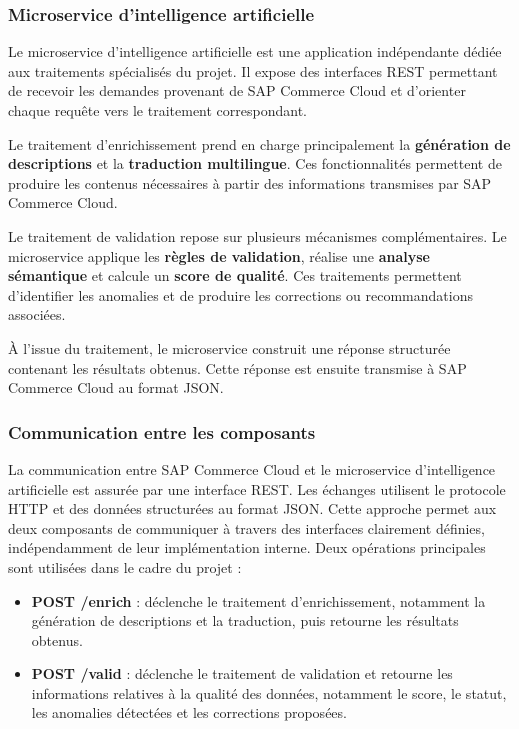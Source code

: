 \subsubsection{Microservice d'intelligence artificielle}

Le microservice d'intelligence artificielle est une application indépendante dédiée aux traitements spécialisés du projet. Il expose des interfaces REST permettant de recevoir les demandes provenant de SAP Commerce Cloud et d'orienter chaque requête vers le traitement correspondant.

Le traitement d'enrichissement prend en charge principalement la \textbf{génération de descriptions} et la \textbf{traduction multilingue}. Ces fonctionnalités permettent de produire les contenus nécessaires à partir des informations transmises par SAP Commerce Cloud.

Le traitement de validation repose sur plusieurs mécanismes complémentaires. Le microservice applique les \textbf{règles de validation}, réalise une \textbf{analyse sémantique} et calcule un \textbf{score de qualité}. Ces traitements permettent d'identifier les anomalies et de produire les corrections ou recommandations associées.

À l'issue du traitement, le microservice construit une réponse structurée contenant les résultats obtenus. Cette réponse est ensuite transmise à SAP Commerce Cloud au format JSON.

\subsubsection{Communication entre les composants}

La communication entre SAP Commerce Cloud et le microservice d'intelligence artificielle est assurée par une interface REST. Les échanges utilisent le protocole HTTP et des données structurées au format JSON. Cette approche permet aux deux composants de communiquer à travers des interfaces clairement définies, indépendamment de leur implémentation interne.
\newpage
Deux opérations principales sont utilisées dans le cadre du projet :

\begin{itemize}
    \item \textbf{POST /enrich} : déclenche le traitement d'enrichissement, notamment la génération de descriptions et la traduction, puis retourne les résultats obtenus.

    \item \textbf{POST /valid} : déclenche le traitement de validation et retourne les informations relatives à la qualité des données, notamment le score, le statut, les anomalies détectées et les corrections proposées.
\end{itemize}

